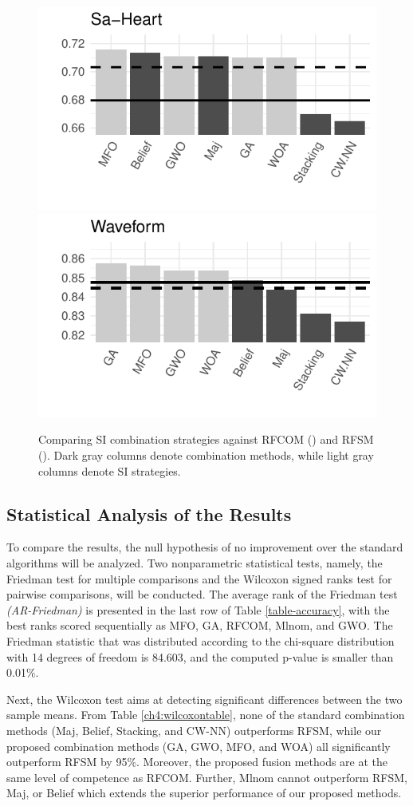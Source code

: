\begin{figure}[!ht]
\begin{center}
 \includegraphics[width=.3\textwidth]{4_Taxonomy/figures/Sa-Heart.pdf}
  \includegraphics[width=.3\textwidth]{4_Taxonomy/figures/Waveform.pdf}

\end{center}
\caption{Comparing SI combination strategies against RFCOM (\protect\RFCOM) and RFSM (\protect\RFSM). Dark gray columns denote combination methods, while light gray columns denote SI strategies.}
\label{histogramplots}
\end{figure}

 
 
 
 \subsection{Statistical Analysis of the Results} \label{statistical}
To compare the results, the null hypothesis of no improvement over the standard algorithms will be analyzed.  Two nonparametric statistical tests, namely, the Friedman test \cite{friedman1937} for multiple comparisons and the Wilcoxon signed ranks test \cite{wilcoxon1945} for pairwise comparisons, will be conducted. The average rank of the Friedman test \textit{(AR-Friedman)} is presented in the last row of Table \ref{table-accuracy}, with the best ranks scored sequentially as MFO, GA, RFCOM, Mlnom, and GWO. The Friedman statistic that was distributed according to the chi-square distribution with 14 degrees of freedom is 84.603, and the computed p-value is smaller than 0.01\%. 


Next, the Wilcoxon test \cite{wilcoxon1945} aims at detecting significant differences between the two sample means. From Table \ref{ch4:wilcoxontable}, none of the standard combination methods (Maj, Belief, Stacking, and CW-NN) outperforms RFSM, while our proposed combination methods (GA, GWO, MFO, and WOA) all significantly outperform RFSM by 95\%. Moreover, the proposed fusion methods are at the same level of competence as RFCOM. Further, Mlnom cannot outperform RFSM, Maj, or Belief which extends the superior performance of our proposed methods.
\vspace*{.3cm}

